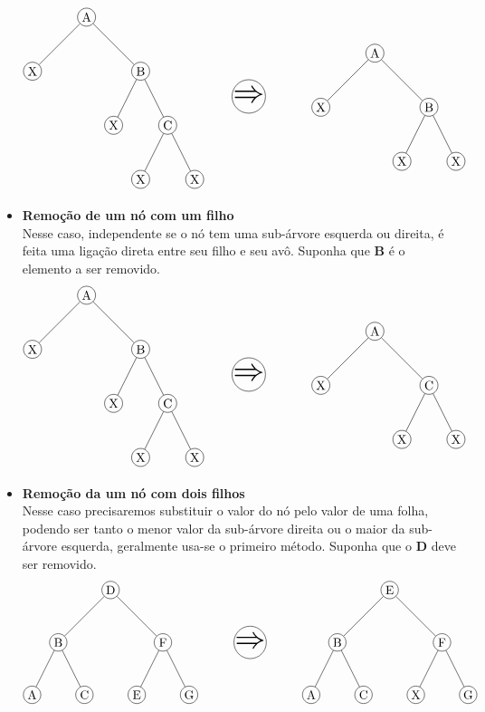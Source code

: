 \begin{itemize}
		\begin{align*}
			\begin{tikzpicture}[
				every node/.style={circle, draw, minimum size=0.5cm, inner sep=0},
				level 1/.style={sibling distance=3cm},
				level 2/.style={sibling distance=1.5cm},
			]
			\node (tree1) at (0,0) {A}
				child {node {X}
				}
				child {node {B}
					child {node {X}
					}
					child {node {C}
						child {node {X}}
						child {node {X}}
					}
				};
				\node[style={}] (arrow) at (4.5,-2.2) {\Huge$\Rightarrow$};
			\node (tree2) at (8,-1) {A}
				child {node {X}
				}
				child {node {B}
					child {node {X}
					}
					child {node {X}
					}
				};
			\end{tikzpicture}
		\end{align*}
	\item \textbf{Remoção de um nó com um filho} \\
		Nesse caso, independente se o nó tem uma sub-árvore esquerda ou direita, é feita uma ligação direta entre seu filho e seu avô. Suponha que \textbf{B} é o elemento a ser removido.
		\begin{align*}
			\begin{tikzpicture}[
				every node/.style={circle, draw, minimum size=0.5cm, inner sep=0},
				level 1/.style={sibling distance=3cm},
				level 2/.style={sibling distance=1.5cm},
			]
			\node (tree1) at (0,0) {A}
				child {node {X}
				}
				child {node {B}
					child {node {X}
					}
					child {node {C}
						child {node {X}}
						child {node {X}}
					}
				};
				\node[style={}] (arrow) at (4.5,-2.2) {\Huge$\Rightarrow$};
			\node (tree2) at (8,-1) {A}
				child {node {X}
				}
				child {node {C}
					child {node {X}
					}
					child {node {X}
					}
				};
			\end{tikzpicture}
		\end{align*}
	\item \textbf{Remoção da um nó com dois filhos} \\
		Nesse caso precisaremos substituir o valor do nó pelo valor de uma folha, podendo ser tanto o menor valor da sub-árvore direita ou o maior da sub-árvore esquerda, geralmente usa-se o primeiro método. Suponha que o \textbf{D} deve ser removido.
		\begin{align*}
			\begin{tikzpicture}[
				every node/.style={circle, draw, minimum size=0.5cm, inner sep=0},
				level 1/.style={sibling distance=3cm},
				level 2/.style={sibling distance=1.5cm},
			]
			\node (tree1) at (0,0) {D}
				child {node {B}
					child {node {A}}
					child {node {C}}
				}
				child {node {F}
					child {node {E}
					}
					child {node {G}
					}
				};
				\node[style={}] (arrow) at (4.0,-1.5) {\Huge$\Rightarrow$};
			\node (tree2) at (8,0) {E}
				child {node {B}
					child {node {A}}
					child {node {C}}
				}
				child {node {F}
					child {node {X}
					}
					child {node {G}
					}
				};
			\end{tikzpicture}
		\end{align*}
\end{itemize}

